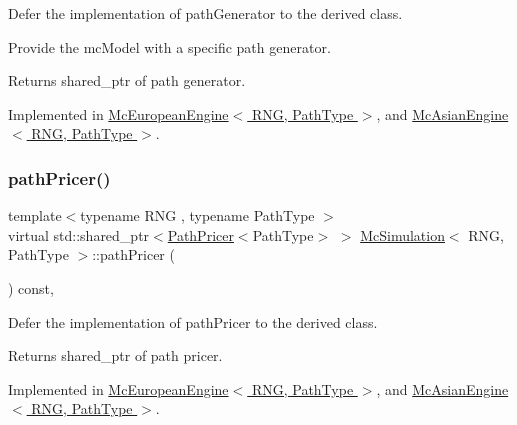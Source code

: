 Defer the implementation of path\+Generator to the derived class. 

Provide the mc\+Model with a specific path generator. \begin{DoxyReturn}{Returns}
shared\+\_\+ptr of path generator. 
\end{DoxyReturn}


Implemented in \hyperlink{class_mc_european_engine_ac0f14a7ff770c69ce802eb662230e4cb}{Mc\+European\+Engine$<$ R\+N\+G, Path\+Type $>$}, and \hyperlink{class_mc_asian_engine_aafae065fc8b31b009b4b42a53b850e82}{Mc\+Asian\+Engine$<$ R\+N\+G, Path\+Type $>$}.

\hypertarget{class_mc_simulation_a64a3e635c1fa9d25797dc0cbad767238}{}\label{class_mc_simulation_a64a3e635c1fa9d25797dc0cbad767238} 
\subsubsection{\texorpdfstring{path\+Pricer()}{pathPricer()}}
{\footnotesize\ttfamily template$<$typename R\+NG , typename Path\+Type $>$ \\
virtual std\+::shared\+\_\+ptr$<$\hyperlink{class_path_pricer}{Path\+Pricer}$<$Path\+Type$>$ $>$ \hyperlink{class_mc_simulation}{Mc\+Simulation}$<$ R\+NG, Path\+Type $>$\+::path\+Pricer (\begin{DoxyParamCaption}{ }\end{DoxyParamCaption}) const\hspace{0.3cm}{\ttfamily [private]}, {}}



Defer the implementation of path\+Pricer to the derived class. 

\begin{DoxyReturn}{Returns}
shared\+\_\+ptr of path pricer. 
\end{DoxyReturn}


Implemented in \hyperlink{class_mc_european_engine_ad4fb94329470643f2edc491bfcb31bdf}{Mc\+European\+Engine$<$ R\+N\+G, Path\+Type $>$}, and \hyperlink{class_mc_asian_engine_a4ad8ccd05433f0668d751a8b3dcbb746}{Mc\+Asian\+Engine$<$ R\+N\+G, Path\+Type $>$}.

\hypertarget{class_mc_simulation_a61ed7348fc9fd05f05ede3c1ef83da16}{}\label{class_mc_simulation_a61ed7348fc9fd05f05ede3c1ef83da16} 
